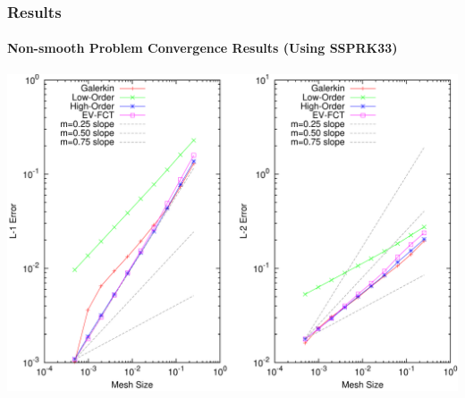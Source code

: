 \documentclass{beamer}
\begin{document}
\begin{frame}
\frametitle{Results}
\framesubtitle{Non-smooth Problem Convergence Results (Using SSPRK33)}

\includegraphics[width=\textwidth]{./figures/convergence_absorber_SSPRK33.pdf}

\end{frame}
\end{document}
